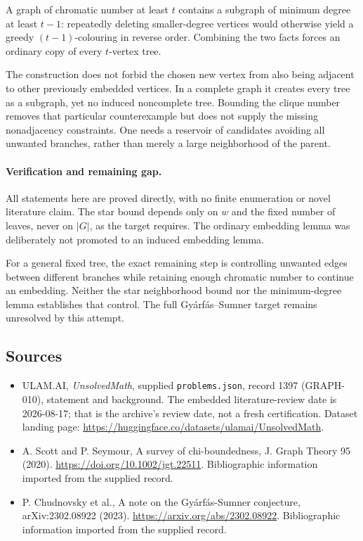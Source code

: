 \documentclass[11pt,a4paper]{article}
\begin{document}
A graph of chromatic number at least $t$ contains a subgraph of minimum degree at least $t-1$: repeatedly deleting smaller-degree vertices would otherwise yield a greedy $(t-1)$-colouring in reverse order. Combining the two facts forces an ordinary copy of every $t$-vertex tree.

The construction does not forbid the chosen new vertex from also being adjacent to other previously embedded vertices. In a complete graph it creates every tree as a subgraph, yet no induced noncomplete tree. Bounding the clique number removes that particular counterexample but does not supply the missing nonadjacency constraints. One needs a reservoir of candidates avoiding all unwanted branches, rather than merely a large neighborhood of the parent.

\paragraph{Verification and remaining gap.}
All statements here are proved directly, with no finite enumeration or novel literature claim. The star bound depends only on $w$ and the fixed number of leaves, never on $|G|$, as the target requires. The ordinary embedding lemma was deliberately not promoted to an induced embedding lemma.

For a general fixed tree, the exact remaining step is controlling unwanted edges between different branches while retaining enough chromatic number to continue an embedding. Neither the star neighborhood bound nor the minimum-degree lemma establishes that control. The full Gy\'arf\'as--Sumner target remains unresolved by this attempt.

\subsection{Sources}

{\small

\begin{itemize}

\item[\hypertarget{source:1397:1}{S1}] ULAM.AI, \emph{UnsolvedMath}, supplied \texttt{problems.json}, record 1397 (GRAPH-010), statement and background. The embedded literature-review date is 2026-08-17; that is the archive’s review date, not a fresh certification. Dataset landing page: \url{https://huggingface.co/datasets/ulamai/UnsolvedMath}.

\item[\hypertarget{source:1397:2}{S2}] A. Scott and P. Seymour, A survey of chi-boundedness, J. Graph Theory 95 (2020). \url{https://doi.org/10.1002/jgt.22511}. Bibliographic information imported from the supplied record.

\item[\hypertarget{source:1397:3}{S3}] P. Chudnovsky et al., A note on the Gyárfás-Sumner conjecture, arXiv:2302.08922 (2023). \url{https://arxiv.org/abs/2302.08922}. Bibliographic information imported from the supplied record.

\end{itemize}

}

\label{end:1397}
\end{document}
